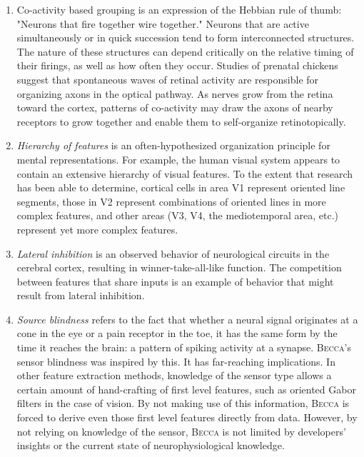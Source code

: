 \begin{enumerate}
\item Co-activity based grouping is an expression of the Hebbian rule of thumb: "Neurons that fire together wire together." Neurons that are active simultaneously or in quick succession tend to form interconnected structures. The nature of these structures can depend critically on the relative timing of their firings, as well as how often they occur. Studies of prenatal chickens suggest that spontaneous waves of retinal activity are responsible for organizing axons in the optical pathway. As nerves grow from the retina toward the cortex, patterns of co-activity may draw the axons of nearby receptors to grow together and enable them to self-organize retinotopically.

\item {\em Hierarchy of features} is an often-hypothesized organization principle for mental representations. For example, the human visual system appears to contain an extensive hierarchy of visual features. To the extent that research has been able to determine, cortical cells in area V1 represent oriented line segments, those in V2 represent combinations of oriented lines in more complex features, and other areas (V3, V4, the mediotemporal area, etc.) represent yet more complex features.

\item {\em Lateral inhibition} is an observed behavior of neurological circuits in the cerebral cortex, resulting in winner-take-all-like function. The competition between features that share inputs is an example of behavior that might result from lateral inhibition.

\item {\em Source blindness} refers to the fact that whether a neural signal originates at a cone in the eye or a pain receptor in the toe, it has the same form by the time it reaches the brain: a pattern of spiking activity at a synapse. \textsc{Becca}'s sensor blindness was inspired by this. It has far-reaching implications. In other feature extraction methods, knowledge of the sensor type allows a certain amount of hand-crafting of first level features, such as oriented Gabor filters in the case of vision. By not making use of this information, \textsc{Becca} is forced to derive even those first level features directly from data. However, by not relying on knowledge of the sensor, \textsc{Becca} is not limited by developers' insights or the current state of neurophysiological knowledge. 


\end{enumerate}
